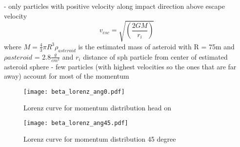 - only particles with positive velocity along impact direction above escape velocity
\begin{equation}
   v_{esc} = \sqrt{\left(\dfrac{2GM}{r_i}\right)}
\end{equation}
where $M = \frac{4}{3}\pi R^3 \rho_{asteroid}$ is the estimated mass of asteroid with R = 75m and $\rho{asteroid}$ = 2.8$\frac{g}{cm^3}$ and $r_i$ distance of sph particle from center of estimated asteroid sphere
- few particles (with highest velocities so the ones that are far away) account for most of the momentum

\begin{figure}[H]
   \centering
   \texttt{[image: beta\_lorenz\_ang0.pdf]}
   \caption{Lorenz curve for momentum distribution head on}
   \label{fig:beta_factor_lorenz_0}
\end{figure}

\begin{figure}[H]
   \centering
   \texttt{[image: beta\_lorenz\_ang45.pdf]}
   \caption{Lorenz curve for momentum distribution 45 degree}
   \label{fig:beta_factor_lorenz_45}
\end{figure}